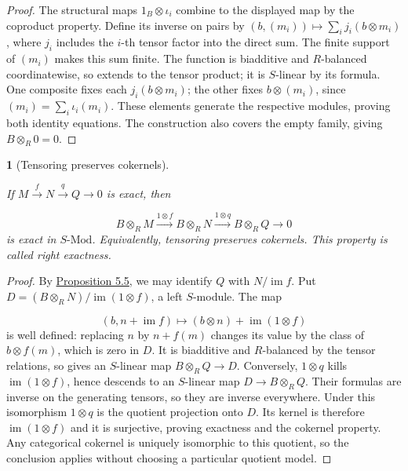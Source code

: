 \documentclass[11pt,a4paper]{article}
\newcommand{\mathheading}{}
\theoremstyle{plain}
\newtheorem*{plainstatement}{\mathheading}
\theoremstyle{definition}
\newenvironment{mathstatement}[3]{\renewcommand{\mathheading}{#1 #2}\begin{plainstatement}[#3]}{\end{plainstatement}}
\begin{document}
\begin{proof}

The structural maps \(1_B\otimes\iota_i\) combine to the displayed map by the coproduct property. Define its inverse on pairs by \((b,(m_i))\mapsto\sum_i j_i(b\otimes m_i)\), where \(j_i\) includes the \(i\)-th tensor factor into the direct sum. The finite support of \((m_i)\) makes this sum finite. The function is biadditive and \(R\)-balanced coordinatewise, so extends to the tensor product; it is \(S\)-linear by its formula. One composite fixes each \(j_i(b\otimes m_i)\); the other fixes \(b\otimes(m_i)\), since \((m_i)=\sum_i\iota_i(m_i)\). These elements generate the respective modules, proving both identity equations. The construction also covers the empty family, giving \(B\otimes_R0=0\).


\end{proof}
 
\begin{mathstatement}{Theorem}{6.7}{Tensoring preserves cokernels}
\label{env-6-7}

If \(M\xrightarrow{f}N\xrightarrow{q}Q\to0\) is exact, then

 \[B\otimes_R M\xrightarrow{1\otimes f}B\otimes_R N\xrightarrow{1\otimes q}B\otimes_R Q\longrightarrow0\] 
is exact in \(S\text{-}\mathrm{Mod}\). Equivalently, tensoring preserves cokernels. This property is called \emph{right exactness}.


\par{}\par

\end{mathstatement}
 
\begin{proof}

By \hyperref[env-5-5]{Proposition 5.5}, we may identify \(Q\) with \(N/\operatorname{im}f\). Put \(D=(B\otimes_R N)/\operatorname{im}(1\otimes f)\), a left \(S\)-module. The map

 \[(b,n+\operatorname{im}f)\longmapsto(b\otimes n)+\operatorname{im}(1\otimes f)\] 
is well defined: replacing \(n\) by \(n+f(m)\) changes its value by the class of \(b\otimes f(m)\), which is zero in \(D\). It is biadditive and \(R\)-balanced by the tensor relations, so gives an \(S\)-linear map \(B\otimes_R Q\to D\). Conversely, \(1\otimes q\) kills \(\operatorname{im}(1\otimes f)\), hence descends to an \(S\)-linear map \(D\to B\otimes_R Q\). Their formulas are inverse on the generating tensors, so they are inverse everywhere. Under this isomorphism \(1\otimes q\) is the quotient projection onto \(D\). Its kernel is therefore \(\operatorname{im}(1\otimes f)\) and it is surjective, proving exactness and the cokernel property. Any categorical cokernel is uniquely isomorphic to this quotient, so the conclusion applies without choosing a particular quotient model.


\end{proof}
 
\end{document}
